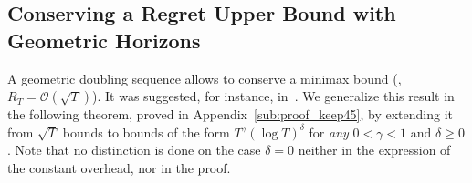 \documentclass[12pt]{colt2018} %
\begin{document}




\subsection{Conserving a Regret Upper Bound with Geometric Horizons}

A geometric doubling sequence allows to conserve a minimax bound (\ie, $R_T = \mathcal{O}(\sqrt{T})$).
It was suggested, for instance, in~\cite[Ex.2.9]{CesaLugosi06}.
%
We generalize this result in the following theorem, proved in Appendix~\ref{sub:proof_keep45}, by extending it from $\sqrt{T}$ bounds to bounds of the form $T^{\gamma} (\log T)^{\delta}$ for \emph{any} $0<\gamma<1$ and $\delta \geq 0$.
%
Note that no distinction is done on the case $\delta=0$ neither in the expression of the constant overhead, nor in the proof.


\end{document}
